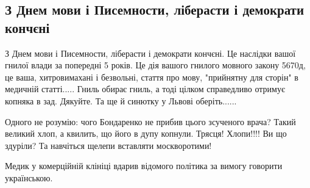 
 
 

\subsection{З Днем мови і Писемности, ліберасти і демократи кончєні}

З Днем мови і Писемности, ліберасти і демократи кончєні. Це наслідки вашої
гнилої влади за попередні 5 років. Це дія вашого гнилого мовного закону 5670д,
це ваша, хитровимахані і безвольні, стаття про мову, "прийнятну для сторін" в
медичній статті..... Гниль обирає гниль, а тоді цілком справедливо отримує
копняка в зад. Дякуйте. Та ще й синютку у Львові оберіть......

Одного не розумію: чого Бондаренко не прибив цього зсученого врача? Такий
великий хлоп, а квилить, що його в дупу копнули. Трясця! Хлопи!!!! Ви що
здуріли? Та навчіться щелепи вставляти москворотими!

Медик у комерційній клініці вдарив відомого політика за вимогу говорити
українською.
